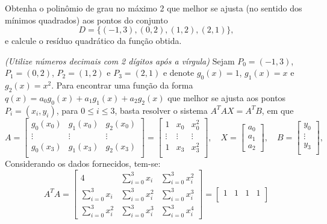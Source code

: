 \documentclass[12pt,a4paper]{article}
\begin{document}
\begin{ExerciseList}
\Exercise[title={2,5}]
Obtenha o polinômio de grau no máximo 2 que melhor se ajusta (no sentido dos mínimos quadrados) aos pontos do conjunto
\[
D = \{(-1, 3), (0, 2), (1, 2), (2, 1) \},
\]
e calcule o resíduo quadrático da função obtida.

{\color{blue} \textit{(Utilize números decimais com 2 dígitos após a vírgula)}}
\Answer
Sejam $P_0 = (-1, 3)$, $P_1 = (0, 2)$, $P_2 = (1, 2)$ e $P_3 = (2, 1)$ e denote $g_0(x) = 1$, $g_1(x) = x$ e $g_2(x) = x^2$. Para encontrar uma função da forma $q(x) = a_0 g_0(x) + a_1 g_1(x)+ a_2 g_2(x)$ que melhor se ajusta aos pontos $P_i = (x_i,y_i)$, para $0 \leq i \leq 3$, basta resolver o sistema $A^T A X = A^T B$, em que
\[
A
= \begin{bmatrix}
g_0(x_0) & g_1(x_0) & g_2(x_0) \\
\vdots   & \vdots   & \vdots   \\
g_0(x_3) & g_1(x_3) & g_2(x_3) \\
\end{bmatrix}
= \begin{bmatrix}
1 & x_0 & x_0^2 \\
\vdots & \vdots & \vdots\\
1 & x_3 & x_3^2 \\
\end{bmatrix},
\quad
X =
\begin{bmatrix}
a_0\\a_1\\a_2
\end{bmatrix},
\quad
B = \begin{bmatrix}
y_0 \\
\vdots \\
y_3 \\
\end{bmatrix},
\]
Considerando os dados fornecidos, tem-se:
\[
A^T A
= \begin{bmatrix}
 4                  & \sum_{i=0}^3 x_i   & \sum_{i=0}^3 x_i^2 \\
\sum_{i=0}^3 x_i    & \sum_{i=0}^3 x_i^2 & \sum_{i=0}^3 x_i^3 \\
\sum_{i=0}^3 x_i^2  & \sum_{i=0}^3 x_i^3 & \sum_{i=0}^3 x_i^4
\end{bmatrix}
=\begin{bmatrix}
 1 & 1 & 1 & 1 \\

\end{bmatrix}\]
\end{ExerciseList}
\end{document}
